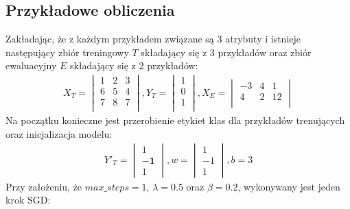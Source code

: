 \documentclass[
    left=2.5cm,         %
    right=2.5cm,        %
    top=2.5cm,          %
    bottom=3cm,         %
    bindingoffset=6mm,  %
    nohyphenation=false %
]{eiti/eiti-report}
\begin{document}
\subsection{Przykładowe obliczenia}
Zakładając, że z każdym przykładem związane są 3 atrybuty i istnieje następujący zbiór treningowy $T$  składający się z 3 przykładów oraz zbiór ewaluacyjny $E$ składający się z 2 przykładów:
\begin{gather*}
    X_T= \begin{vmatrix}
        1&2&3\\
        6&5&4\\
        7&8&7\\
    \end{vmatrix},
    Y_T= \begin{vmatrix}
        1\\
        0\\
        1\\
    \end{vmatrix}, 
    X_E= \begin{vmatrix}
        -3&4&1\\
        4&2&12\\
    \end{vmatrix}
\end{gather*}
Na początku konieczne jest przerobienie etykiet klas dla przykładów trenujących oraz inicjalizacja modelu:
\begin{gather*}
    Y'_T= \begin{vmatrix}
        1\\
        \pmb{-1}\\
        1
    \end{vmatrix}, 
    w = \begin{vmatrix}
        1\\
        -1\\
        1
    \end{vmatrix},  b = 3
\end{gather*}
Przy założeniu, że $max\_steps=1$, $\lambda = 0.5$ oraz $\beta = 0.2$, wykonywany jest jeden krok SGD:
\end{document}
